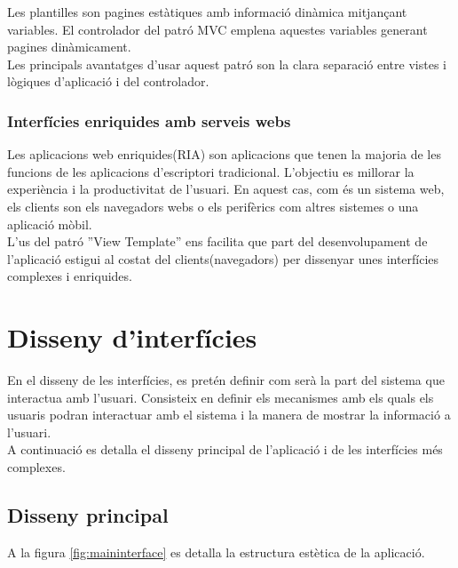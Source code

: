 Les plantilles son pagines estàtiques amb informació dinàmica mitjançant variables. El controlador del patró MVC emplena aquestes variables generant pagines dinàmicament.\cite{viewtemplate}\\

Les principals avantatges d'usar aquest patró son la clara separació entre vistes i lògiques d'aplicació i del controlador.  

\label{ria}
\subsubsection{Interfícies enriquides amb serveis webs}
Les aplicacions web enriquides(RIA) son aplicacions que tenen la majoria de les funcions de les aplicacions d'escriptori tradicional. L'objectiu es millorar la experiència i la productivitat de l'usuari. En aquest cas, com \'{e}s un sistema web, els clients son els navegadors webs o els perifèrics com altres sistemes o una aplicació mòbil.\cite{ria}\\

L'us del patró ''View Template'' ens facilita que part del desenvolupament de l'aplicació estigui al costat del clients(navegadors) per dissenyar unes interfícies complexes i enriquides.\\ 

\section{Disseny d'interf\'{i}cies}
\label{sec:dessigninterfaces}
En el disseny de les interfícies, es pretén definir com serà la part del sistema que interactua amb l’usuari. Consisteix en definir els mecanismes amb els quals els usuaris podran interactuar amb el sistema i la manera de mostrar la informació a l’usuari.\\

A continuació es detalla el disseny principal de l'aplicació i de les interfícies m\'{e}s complexes.

\subsection{Disseny principal}
\label{subsec:maindessign}
A la figura \ref{fig:maininterface} es detalla la estructura estètica de la aplicació. 

